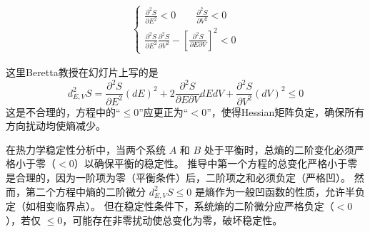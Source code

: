 \begin{thm}
\begin{enumerate}
\begin{itemize}
\begin{align*}
            \begin{cases} 
            \frac{\partial^2 S}{\partial E^2} < 0 \qquad \frac{\partial^2 S}{\partial V^2} < 0 \\ 
            \frac{\partial^2 S}{\partial E^2} \frac{\partial^2 S}{\partial V^2} - \left[ \frac{\partial^2 S}{\partial E \partial V} \right]^2 < 0 
            \end{cases}
\end{align*}
\begin{zhu}\label{<>}
    这里Beretta教授在幻灯片上写的是
    \[
        d_{E,V}^2 S = \frac{\partial^2 S}{\partial E^2} (dE)^2 + 2 \frac{\partial^2 S}{\partial E \partial V} dEdV + \frac{\partial^2 S}{\partial V^2} (dV)^2 \boxed{\leq} 0
    \]
    这是不合理的，方程中的“$\leq0$”应更正为“$<0$”，使得Hessian矩阵负定，确保所有方向扰动均使熵减少。

    在热力学稳定性分析中，当两个系统 \( A \) 和 \( B \) 处于平衡时，总熵的二阶变化必须严格小于零（\(<0\)）以确保平衡的稳定性。
    推导中第一个方程的总变化严格小于零是合理的，因为一阶项为零（平衡条件）后，二阶项之和必须负定（严格凹）。
    然而，第二个方程中熵的二阶微分 \( d^2_{E,V} S \leq 0 \) 是熵作为一般凹函数的性质，允许半负定（如相变临界点）。
    但在稳定性条件下，系统熵的二阶微分应严格负定（\(<0\)），若仅 \( \leq 0 \)，可能存在非零扰动使总变化为零，破坏稳定性。
    

\end{zhu}
\end{itemize}
\end{enumerate}
\end{thm}
